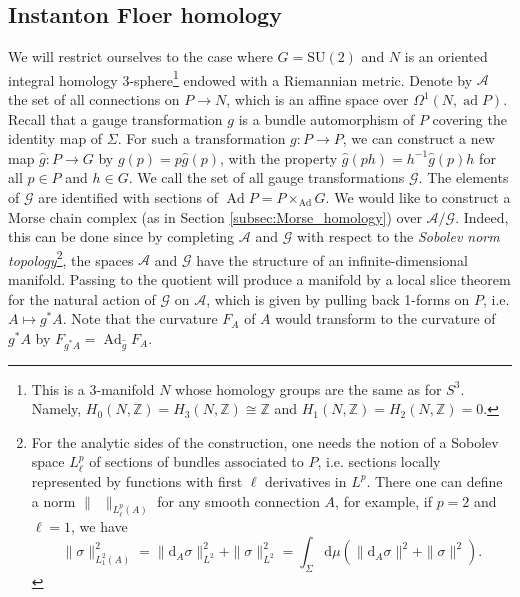 \documentclass[11pt,colorinlistoftodos]{amsart}
\numberwithin{equation}{subsection}
\theoremstyle{plain}
\theoremstyle{definition}
\theoremstyle{remark}
\newcommand{\Z}{\mathbb{Z}}
\newcommand{\dd}{{\mathrm{d}}}
\DeclareMathOperator{\ad}{ad}
\DeclareMathOperator{\Ad}{Ad}
\newcommand{\de}{\partial}
\begin{document}
\subsection{Instanton Floer homology}\label{subsec:Instanton_Floer_homology}
We will restrict ourselves to the case where $G=\mathrm{SU}(2)$ and $N$ is an oriented integral homology 3-sphere\footnote{This is a 3-manifold $N$ whose homology groups are the same as for $S^3$. Namely, $H_0(N,\Z)=H_3(N,\Z)\cong \Z$ and $H_1(N,\Z)=H_2(N,\Z)=0$.} endowed with a Riemannian metric. Denote by $\mathcal{A}$ the set of all connections on $P\to N$, which is an affine space over $\Omega^1(N,\ad P)$. Recall that a gauge transformation $g$ is a bundle automorphism of $P$ covering the identity map of $\Sigma$. For such a transformation $g\colon P\to P$, we can construct a new map $\hat g\colon P\to G$ by $g(p)=p\hat g(p)$, with the property $\hat g(ph)=h^{-1}\hat g(p)h$ for all $p\in P$ and $h\in G$. We call the set of all gauge transformations $\mathcal{G}$. The elements of $\mathcal{G}$ are identified with sections of $\Ad P=P\times_{\Ad} G$. We would like to construct a Morse chain complex (as in Section \ref{subsec:Morse_homology}) over $\mathcal{A}/\mathcal{G}$. Indeed, this can be done since by completing $\mathcal{A}$ and $\mathcal{G}$ with respect to the \emph{Sobolev norm topology}\footnote{For the analytic sides of the construction, one needs the notion of a Sobolev space $L^p_\ell$ of sections of bundles associated to $P$, i.e. sections locally represented by functions with first $\ell$ derivatives in $L^p$. There one can define a norm $\|\enspace\|_{L^p_\ell(A)}$ for any smooth connection $A$, for example, if $p=2$ and $\ell=1$, we have 
\[
\|\sigma\|^2_{L^2_1(A)}=\|\dd_A\sigma\|^2_{L^2}+\|\sigma\|^2_{L^2}=\int_\Sigma\dd\mu\left(\| \dd_A\sigma\|^2+\|\sigma\|^2\right).
\]}, the spaces $\mathcal{A}$ and $\mathcal{G}$ have the structure of an infinite-dimensional manifold. Passing to the quotient will produce a manifold by a local slice theorem for the natural action of $\mathcal{G}$ on $\mathcal{A}$, which is given by pulling back 1-forms on $P$, i.e. $A\mapsto g^*A$. Note that the curvature $F_A$ of $A$ would transform to the curvature of $g^*A$ by $F_{g^*A}=\Ad_{\hat g}F_A$. 
\end{document}
